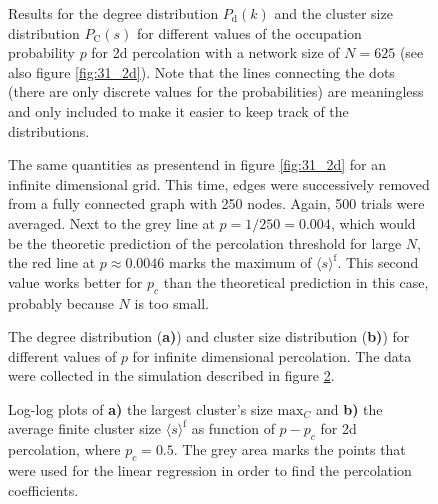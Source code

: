 \documentclass{scrartcl}
\begin{document}
\begin{figure}
    \caption{Results for the degree distribution $P_\mathrm{d}(k)$ and the
        cluster size distribution $P_\mathrm{C}(s)$ for different
        values of the occupation probability $p$ for 2d percolation with
        a network size of $N=625$ (see also figure \ref{fig:31_2d}). Note that the
        lines connecting the dots (there are only discrete values for the
        probabilities) are meaningless and only included to make it easier to
        keep track of the distributions.}
    \label{fig:31_2d_dist}
\end{figure}

\begin{figure}
    \caption{The same quantities as presentend in figure \ref{fig:31_2d}
        for an infinite dimensional grid. This time, edges were successively
        removed from a fully connected graph with 250 nodes. Again, 500 trials were
        averaged. Next to the grey line at $p=1/250=0.004$, which would be the theoretic prediction of the
        percolation threshold for large $N$, the red line at $p\approx 0.0046$
        marks the maximum of $\langle s \rangle^\mathrm{f}$. This second value works better
        for $p_c$ than the theoretical prediction in this case,
        probably because $N$ is too small.}
    \label{fig:31_infty}
\end{figure}

\begin{figure}
    \caption{The degree distribution (\textbf{a)}) and cluster size
        distribution (\textbf{b)}) for different values of $p$ for infinite
        dimensional percolation. The data were collected in the simulation
        described in figure \ref{fig:31_infty}.}
    \label{fig:31_infty_dist}
\end{figure}

\begin{figure}
    \caption{Log-log plots of \textbf{a)} the largest cluster's size
        $\mathrm{max}_C$ and \textbf{b)} the average finite cluster size
        $\langle s\rangle^\mathrm{f}$ as function of $p-p_c$ for 2d
        percolation, where $p_c=0.5$. The grey area marks the points that were
        used for the linear regression in order to find the percolation
        coefficients.}
    \label{fig:32_2d}
\end{figure}
\end{document}
